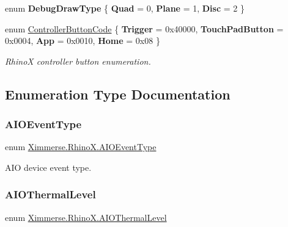 \begin{DoxyCompactItemize}
\mbox{\label{namespace_ximmerse_1_1_rhino_x_a5c7459799bea7e5e5259ac6b5bcf5fcb}} 
enum {\bfseries Debug\+Draw\+Type} \{ {\bfseries Quad} = 0, 
{\bfseries Plane} = 1, 
{\bfseries Disc} = 2
 \}
\item 
enum \mbox{\hyperlink{namespace_ximmerse_1_1_rhino_x_a99f73f11bba9d4b424daba6c5a5abc0b}{Controller\+Button\+Code}} \{ {\bfseries Trigger} = 0x40000, 
{\bfseries Touch\+Pad\+Button} = 0x0004, 
{\bfseries App} = 0x0010, 
{\bfseries Home} = 0x08
 \}
\begin{DoxyCompactList}\small\item\em RhinoX controller button enumeration. \end{DoxyCompactList}\end{DoxyCompactItemize}


\subsection{Enumeration Type Documentation}
\mbox{\label{namespace_ximmerse_1_1_rhino_x_ab081ae2f0ca6ea05a0a1ab6143ba91a1}} 
\subsubsection{\texorpdfstring{A\+I\+O\+Event\+Type}{AIOEventType}}
{\footnotesize\ttfamily enum \mbox{\hyperlink{namespace_ximmerse_1_1_rhino_x_ab081ae2f0ca6ea05a0a1ab6143ba91a1}{Ximmerse.\+Rhino\+X.\+A\+I\+O\+Event\+Type}}\hspace{0.3cm}{\ttfamily [strong]}}



A\+IO device event type. 

\mbox{\label{namespace_ximmerse_1_1_rhino_x_a5dc681e0c88cfeddf5c073421b71b0a4}} 
\subsubsection{\texorpdfstring{A\+I\+O\+Thermal\+Level}{AIOThermalLevel}}
{\footnotesize\ttfamily enum \mbox{\hyperlink{namespace_ximmerse_1_1_rhino_x_a5dc681e0c88cfeddf5c073421b71b0a4}{Ximmerse.\+Rhino\+X.\+A\+I\+O\+Thermal\+Level}}\hspace{0.3cm}{\ttfamily [strong]}}



